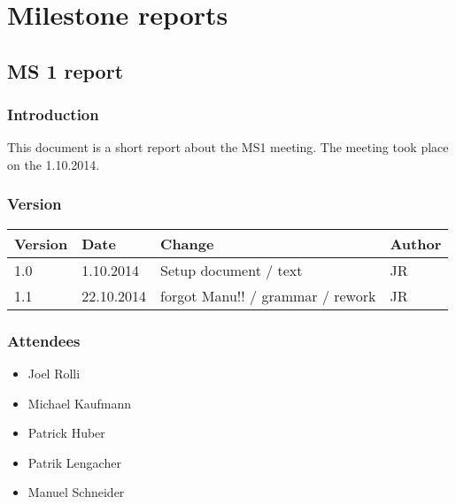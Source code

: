 
\chapter{Milestone reports} %

\label{Milestone reports} %



\section{MS 1 report}
\label{reports:ms1report}

\subsection{Introduction}

This document is a short report about the MS1 meeting. The meeting took place on the 1.10.2014.

\subsection{Version}


\begin{tabular}{| p{1.5cm} | p{2cm} | p{9cm} | p{1.5cm} |}
    \hline
    Version & Date      & Change & Author \\ \hline
    1.0    & 1.10.2014        & Setup document / text                                        & JR \\ \hline
    1.1    & 22.10.2014        & forgot Manu!! / grammar / rework                                        & JR \\ \hline
\end{tabular}


\subsection{Attendees}
\begin{itemize}
\item Joel Rolli
\item Michael Kaufmann
\item Patrick Huber
\item Patrik Lengacher
\item Manuel Schneider
\end{itemize}


